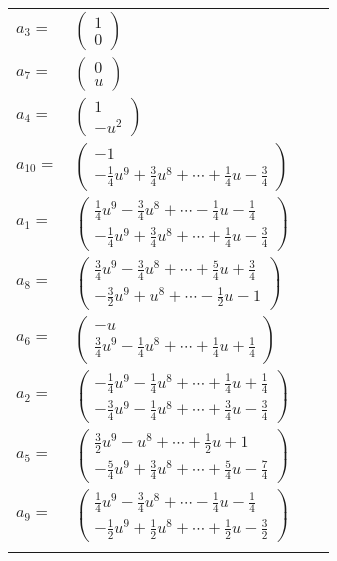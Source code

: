 \documentclass[1p]{elsarticle_modified}
\theoremstyle{definition}
\begin{document}
\begin{tabular}{m{7pt} m{180pt} m{7pt} m{180pt} }
\flushright $a_{3}=$&$\begin{pmatrix}1\\0\end{pmatrix}$ \\
\flushright $a_{7}=$&$\begin{pmatrix}0\\u\end{pmatrix}$ \\
\flushright $a_{4}=$&$\begin{pmatrix}1\\- u^2\end{pmatrix}$ \\
\flushright $a_{10}=$&$\begin{pmatrix}-1\\-\frac{1}{4} u^9+\frac{3}{4} u^8+\cdots+\frac{1}{4} u-\frac{3}{4}\end{pmatrix}$ \\
\flushright $a_{1}=$&$\begin{pmatrix}\frac{1}{4} u^9-\frac{3}{4} u^8+\cdots-\frac{1}{4} u-\frac{1}{4}\\-\frac{1}{4} u^9+\frac{3}{4} u^8+\cdots+\frac{1}{4} u-\frac{3}{4}\end{pmatrix}$ \\
\flushright $a_{8}=$&$\begin{pmatrix}\frac{3}{4} u^9-\frac{3}{4} u^8+\cdots+\frac{5}{4} u+\frac{3}{4}\\-\frac{3}{2} u^9+u^8+\cdots-\frac{1}{2} u-1\end{pmatrix}$ \\
\flushright $a_{6}=$&$\begin{pmatrix}- u\\\frac{3}{4} u^9-\frac{1}{4} u^8+\cdots+\frac{1}{4} u+\frac{1}{4}\end{pmatrix}$ \\
\flushright $a_{2}=$&$\begin{pmatrix}-\frac{1}{4} u^9-\frac{1}{4} u^8+\cdots+\frac{1}{4} u+\frac{1}{4}\\-\frac{3}{4} u^9-\frac{1}{4} u^8+\cdots+\frac{3}{4} u-\frac{3}{4}\end{pmatrix}$ \\
\flushright $a_{5}=$&$\begin{pmatrix}\frac{3}{2} u^9- u^8+\cdots+\frac{1}{2} u+1\\-\frac{5}{4} u^9+\frac{3}{4} u^8+\cdots+\frac{5}{4} u-\frac{7}{4}\end{pmatrix}$ \\
\flushright $a_{9}=$&$\begin{pmatrix}\frac{1}{4} u^9-\frac{3}{4} u^8+\cdots-\frac{1}{4} u-\frac{1}{4}\\-\frac{1}{2} u^9+\frac{1}{2} u^8+\cdots+\frac{1}{2} u-\frac{3}{2}\end{pmatrix}$\\&\end{tabular}
\end{document}
